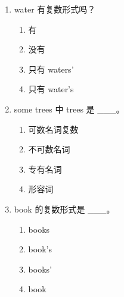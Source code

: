 \documentclass[11pt,a4paper]{ctexart}
\begin{document}
\begin{enumerate}[leftmargin=*,itemsep=4pt]
\begin{enumerate}[label=\Alph*.,leftmargin=2em,itemsep=1pt,topsep=2pt]
\end{enumerate}
\item water 有复数形式吗？
\begin{enumerate}[label=\Alph*.,leftmargin=2em,itemsep=1pt,topsep=2pt]
\item 有
\item 没有
\item 只有 waters’
\item 只有 water’s
\end{enumerate}
\item some trees 中 trees 是 \_\_\_。
\begin{enumerate}[label=\Alph*.,leftmargin=2em,itemsep=1pt,topsep=2pt]
\item 可数名词复数
\item 不可数名词
\item 专有名词
\item 形容词
\end{enumerate}
\item book 的复数形式是 \_\_\_。
\begin{enumerate}[label=\Alph*.,leftmargin=2em,itemsep=1pt,topsep=2pt]
\item books
\item book’s
\item books’
\item book
\end{enumerate}
\end{enumerate}
\end{document}
